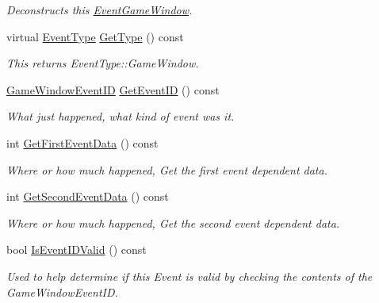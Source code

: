 \begin{DoxyCompactItemize}
\begin{DoxyCompactList}\small\item\em Deconstructs this \hyperlink{classphys_1_1EventGameWindow}{EventGameWindow}. \item\end{DoxyCompactList}\item 
virtual \hyperlink{classphys_1_1EventBase_a5e6a8564e127f654123f0bf6a2751923}{EventType} \hyperlink{classphys_1_1EventGameWindow_ab43a924a6c347823b0af51145974e297}{GetType} () const 
\begin{DoxyCompactList}\small\item\em This returns EventType::GameWindow. \item\end{DoxyCompactList}\item 
\hyperlink{classphys_1_1EventGameWindow_a45225255070513d3cff88cdfea25cc09}{GameWindowEventID} \hyperlink{classphys_1_1EventGameWindow_a9454b837e1f09e3927d3666dc8b5d88b}{GetEventID} () const 
\begin{DoxyCompactList}\small\item\em What just happened, what kind of event was it. \item\end{DoxyCompactList}\item 
int \hyperlink{classphys_1_1EventGameWindow_a28f0c0e000107bcce2b118c8d1657492}{GetFirstEventData} () const 
\begin{DoxyCompactList}\small\item\em Where or how much happened, Get the first event dependent data. \item\end{DoxyCompactList}\item 
int \hyperlink{classphys_1_1EventGameWindow_a477ef27390df3efa13cc37499e841f06}{GetSecondEventData} () const 
\begin{DoxyCompactList}\small\item\em Where or how much happened, Get the second event dependent data. \item\end{DoxyCompactList}\item 
bool \hyperlink{classphys_1_1EventGameWindow_a9717be3e8429e0477be014ac57aa3679}{IsEventIDValid} () const 
\begin{DoxyCompactList}\small\item\em Used to help determine if this Event is valid by checking the contents of the GameWindowEventID. \item\end{DoxyCompactList}\end{DoxyCompactItemize}
